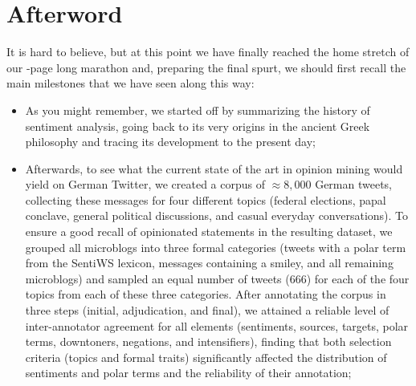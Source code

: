 \chapter*{Afterword}

It is hard to believe, but at this point we have finally reached the
home stretch of our \thepage-page long marathon and, preparing the
final spurt, we should first recall the main milestones that we have
seen along this way:
\begin{itemize}
\item As you might remember, we started off by summarizing the history
  of sentiment analysis, going back to its very origins in the ancient
  Greek philosophy and tracing its development to the present day;

\item Afterwards, to see what the current state of the art in opinion
  mining would yield on German Twitter, we created a corpus of
  $\approx8,000$ German tweets, collecting these messages for four
  different topics (federal elections, papal conclave, general
  political discussions, and casual everyday conversations).  To
  ensure a good recall of opinionated statements in the resulting
  dataset, we grouped all microblogs into three formal categories
  (tweets with a polar term from the SentiWS lexicon, messages
  containing a smiley, and all remaining microblogs) and sampled an
  equal number of tweets (666) for each of the four topics from each
  of these three categories.  After annotating the corpus in three
  steps (initial, adjudication, and final), we attained a reliable
  level of inter-annotator agreement for all elements (sentiments,
  sources, targets, polar terms, downtoners, negations, and
  intensifiers), finding that both selection criteria (topics and
  formal traits) significantly affected the distribution of sentiments
  and polar terms and the reliability of their annotation;


\end{itemize}
